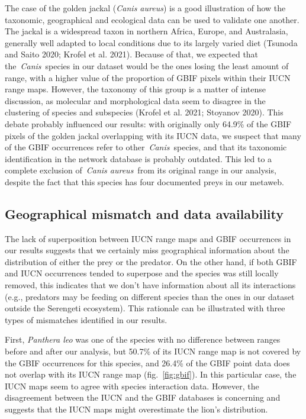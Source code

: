 \documentclass[10pt,oneside]{article}
\begin{document}
The case of the golden jackal (\emph{Canis aureus}) is a good
illustration of how the taxonomic, geographical and ecological data can
be used to validate one another. The jackal is a widespread taxon in
northern Africa, Europe, and Australasia, generally well adapted to
local conditions due to its largely varied diet (Tsunoda and Saito 2020;
Krofel et al. 2021). Because of that, we expected that
the~\emph{Canis}~species in our dataset would be the ones losing the
least amount of range, with a higher value of the proportion of GBIF
pixels within their IUCN range maps. However, the taxonomy of this group
is a matter of intense discussion, as molecular and morphological data
seem to disagree in the clustering of species and subspecies (Krofel et
al. 2021; Stoyanov 2020). This debate probably influenced our results:
with originally only 64.9\% of the GBIF pixels of the golden jackal
overlapping with its IUCN data, we suspect that many of the GBIF
occurrences refer to other~\emph{Canis}~species, and that its taxonomic
identification in the network database is probably outdated. This led to
a complete exclusion of~\emph{Canis aureus}~from its original range in
our analysis, despite the fact that this species has four documented
preys in our metaweb.

\hypertarget{geographical-mismatch-and-data-availability}{%
\subsection{Geographical mismatch and data
availability}\label{geographical-mismatch-and-data-availability}}

The lack of superposition between IUCN range maps and GBIF occurrences
in our results suggests that we certainly miss geographical information
about the distribution of either the prey or the predator. On the other
hand, if both GBIF and IUCN occurrences tended to superpose and the
species was still locally removed, this indicates that we don't have
information about all its interactions (e.g., predators may be feeding
on different species than the ones in our dataset outside the Serengeti
ecosystem). This rationale can be illustrated with three types of
mismatches identified in our results.

First, \emph{Panthera leo} was one of the species with no difference
between ranges before and after our analysis, but 50.7\% of its IUCN
range map is not covered by the GBIF occurrences for this species, and
26.4\% of the GBIF point data does not overlap with its IUCN range map
(fig.~\ref{fig:gbif}). In this particular case, the IUCN maps seem to
agree with species interaction data. However, the disagreement between
the IUCN and the GBIF databases is concerning and suggests that the IUCN
maps might overestimate the lion's distribution.
\end{document}
